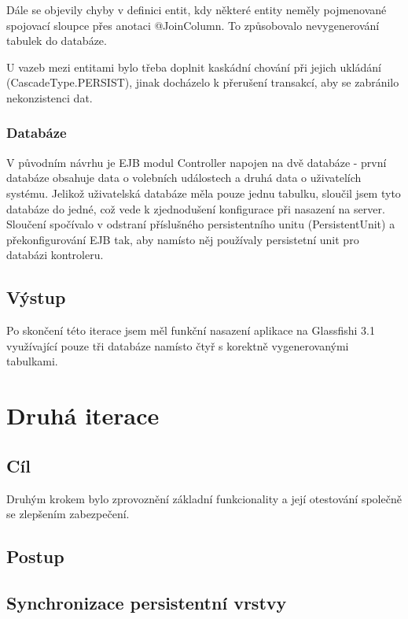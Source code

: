 \documentclass[11pt,twoside,a4paper]{book}
\begin{document}
Dále se objevily chyby v definici entit, kdy některé entity neměly pojmenované spojovací sloupce přes anotaci @JoinColumn. To způsobovalo nevygenerování tabulek do databáze.

U vazeb mezi entitami bylo třeba doplnit kaskádní chování při jejich ukládání (CascadeType.PERSIST), jinak docházelo k přerušení transakcí, aby se zabránilo nekonzistenci dat.

\subsubsection{Databáze}

V původním návrhu je EJB modul Controller napojen na dvě databáze - první databáze obsahuje data o volebních událostech a druhá data o uživatelích systému. Jelikož uživatelská databáze měla pouze jednu tabulku, sloučil jsem tyto databáze do jedné, což vede k zjednodušení konfigurace při nasazení na server. Sloučení spočívalo v odstraní příslušného persistentního unitu (PersistentUnit) a překonfigurování EJB tak, aby namísto něj používaly persistetní unit pro databázi kontroleru.

\subsection{Výstup}

Po skončení této iterace jsem měl funkční nasazení aplikace na Glassfishi 3.1 využívající pouze tři databáze namísto čtyř s korektně vygenerovanými tabulkami.


\section{Druhá iterace}

\subsection{Cíl}

Druhým krokem bylo zprovoznění základní funkcionality a její otestování společně se zlepšením zabezpečení.

\subsection{Postup}

\subsection{Synchronizace persistentní vrstvy}
\end{document}

